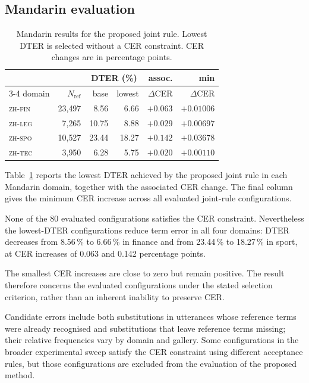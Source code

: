\documentclass{article}
\newcommand{\zhfin}{\textsc{zh-fin}}
\newcommand{\zhleg}{\textsc{zh-leg}}
\newcommand{\zhspo}{\textsc{zh-spo}}
\newcommand{\zhtec}{\textsc{zh-tec}}
\begin{document}
\subsection{Mandarin evaluation}
\label{sec:boundary}

\begin{table}[t]
\centering
\caption{Mandarin results for the proposed joint rule. Lowest DTER is selected
without a CER constraint. CER changes are in percentage points.}
\label{tab:mandarin}
\setlength{\tabcolsep}{3.0pt}\small
\begin{tabular}{lrrrrr}
\toprule
 & & \multicolumn{2}{c}{DTER (\%)} & assoc. & min \\
\cmidrule(lr){3-4}
domain & $N_{\mathrm{ref}}$ & base & lowest & $\Delta$CER & $\Delta$CER \\
\midrule
\zhfin{} & 23{,}497 & \phantom{0}8.56 & \phantom{0}6.66 & $+0.063$ & $+0.01006$ \\
\zhleg{} & \phantom{0}7{,}265 & 10.75 & \phantom{0}8.88 & $+0.029$ & $+0.00697$ \\
\zhspo{} & 10{,}527 & 23.44 & 18.27 & $+0.142$ & $+0.03678$ \\
\zhtec{} & \phantom{0}3{,}950 & \phantom{0}6.28 & \phantom{0}5.75 & $+0.020$ & $+0.00110$ \\
\bottomrule
\end{tabular}
\end{table}

Table~\ref{tab:mandarin} reports the lowest DTER achieved by the proposed joint
rule in each Mandarin domain, together with the associated CER change. The final
column gives the minimum CER increase across all evaluated joint-rule
configurations.

None of the 80 evaluated configurations satisfies the CER constraint. Nevertheless the lowest-DTER configurations reduce term error in all four domains: DTER decreases from 8.56\,\% to 6.66\,\% in finance and from 23.44\,\% to 18.27\,\% in sport, at CER increases of 0.063 and 0.142 percentage points.


The smallest CER increases are close to zero but remain positive. The result
therefore concerns the evaluated configurations under the stated selection
criterion, rather than an inherent inability to preserve CER.

Candidate errors include both substitutions in utterances whose reference terms
were already recognised and substitutions that leave reference terms missing;
their relative frequencies vary by domain and gallery. Some configurations in
the broader experimental sweep satisfy the CER constraint using different
acceptance rules, but those configurations are excluded from the evaluation of
the proposed method.
\end{document}

